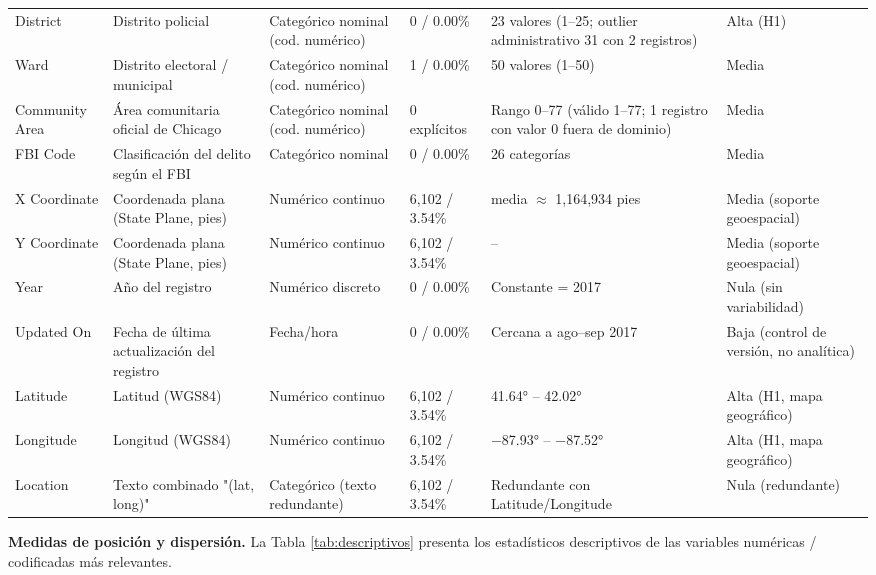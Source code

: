 \documentclass[11pt,a4paper]{article}
\begin{document}
\begin{landscape}
\begin{longtable}{P{2.6cm} P{4.0cm} P{1.6cm} P{2.0cm} P{4.4cm} P{3.4cm}}
District & Distrito policial & Categórico nominal (cod. numérico) & 0 / 0.00\% & 23 valores (1--25; outlier administrativo 31 con 2 registros) & Alta (H1) \\
Ward & Distrito electoral / municipal & Categórico nominal (cod. numérico) & 1 / 0.00\% & 50 valores (1--50) & Media \\
Community Area & Área comunitaria oficial de Chicago & Categórico nominal (cod. numérico) & 0 explícitos & Rango 0--77 (válido 1--77; 1 registro con valor 0 fuera de dominio) & Media \\
FBI Code & Clasificación del delito según el FBI & Categórico nominal & 0 / 0.00\% & 26 categorías & Media \\
X Coordinate & Coordenada plana (State Plane, pies) & Numérico continuo & 6,102 / 3.54\% & media $\approx$ 1,164,934 pies & Media (soporte geoespacial) \\
Y Coordinate & Coordenada plana (State Plane, pies) & Numérico continuo & 6,102 / 3.54\% & -- & Media (soporte geoespacial) \\
Year & Año del registro & Numérico discreto & 0 / 0.00\% & Constante = 2017 & Nula (sin variabilidad) \\
Updated On & Fecha de última actualización del registro & Fecha/hora & 0 / 0.00\% & Cercana a ago--sep 2017 & Baja (control de versión, no analítica) \\
Latitude & Latitud (WGS84) & Numérico continuo & 6,102 / 3.54\% & 41.64° -- 42.02° & Alta (H1, mapa geográfico) \\
Longitude & Longitud (WGS84) & Numérico continuo & 6,102 / 3.54\% & $-$87.93° -- $-$87.52° & Alta (H1, mapa geográfico) \\
Location & Texto combinado "(lat, long)" & Categórico (texto redundante) & 6,102 / 3.54\% & Redundante con Latitude/Longitude & Nula (redundante) \\
\end{longtable}
\end{landscape}

\textbf{Medidas de posición y dispersión.} La Tabla \ref{tab:descriptivos}
presenta los estadísticos descriptivos de las variables numéricas /
codificadas más relevantes.
\end{document}
